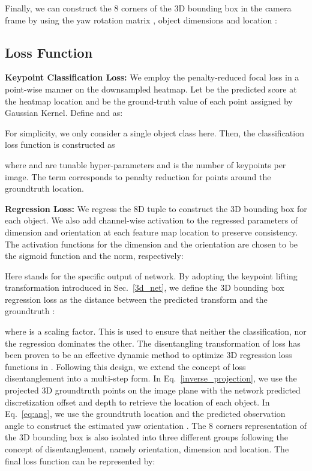 \documentclass[10pt,twocolumn,letterpaper]{article}
\renewcommand{\paragraph}[1]{

        \vspace{3pt}
	\noindent\textbf{#1}}
\begin{document}
    
    Finally, we can construct the 8 corners of the 3D bounding box in the camera frame by using the yaw rotation matrix , object dimensions  and location  :

    

\subsection{Loss Function}
    \paragraph{Keypoint Classification Loss:} 
    We employ the penalty-reduced focal loss \cite{cornernet_2018, centernet_2019} in a point-wise manner on the downsampled heatmap. Let  be the predicted score at the heatmap location  and  be the ground-truth value of each point assigned by Gaussian Kernel. Define  and  as:
    
    
    For simplicity, we only consider a single object class here. Then, the classification loss function is constructed as
    
    where  and  are tunable hyper-parameters and  is the number of keypoints per image. The term  corresponds to penalty reduction for points around the groundtruth location.
    
    \paragraph{Regression Loss:} 
    We regress the 8D tuple  to construct the 3D bounding box for each object. We also add channel-wise activation to the regressed parameters of dimension and orientation at each feature map location to preserve consistency. The activation functions for the dimension and the orientation are chosen to be the sigmoid function  and the  norm, respectively:
    
    Here  stands for the specific output of network. By adopting the keypoint lifting transformation introduced in Sec.~\ref{3d_net}, we define the 3D bounding box regression loss as the  distance between the predicted transform  and the groundtruth :

    where  is a scaling factor. This is used to ensure that neither the classification, nor the regression dominates the other. The disentangling transformation of loss has been proven to be an effective dynamic method to optimize 3D regression loss functions in \cite{monodis_2019}. Following this design, we extend the concept of loss disentanglement into a multi-step form. In Eq.~\eqref{inverse_projection}, we use the projected 3D groundtruth points on the image plane  with the network predicted discretization offset  and depth  to retrieve  the location  of each object. In Eq.~\eqref{eq:ang}, we use the groundtruth location  and the predicted observation angle  to construct the estimated yaw orientation . The 8 corners representation of the 3D bounding box is also isolated into three different groups following the concept of disentanglement, namely orientation, dimension and location. The final loss function can be represented by:
    
\end{document}

